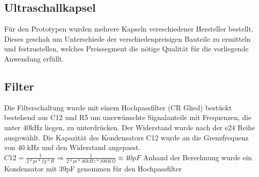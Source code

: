 \subsection{Ultraschallkapsel}%
Für den Prototypen wurden mehrere Kapseln vereschiedener Hersteller bestellt. Dieses geschah um Unterschiede der verschiedenpreisigen Bauteile zu ermitteln und festzustellen, welches Preissegment die nötige Qualität für die vorliegende Anwendung erfüllt.


\subsection{Filter}%
Die Filterschaltung wurde mit einem Hochpassfilter (CR Glied) bestückt bestehend aus C12 und R5 um unerwünschte Signalanteile mit Frequenzen, die unter 40kHz liegen, zu unterdrücken. Der Widerstand wurde nach der e24 Reihe ausgewählt.
Die Kapazität des Kondensators C12 wurde an die Grenzfrequenz von 40 kHz und den Widerstand angepasst.
\onehalfspacing \\
\(\displaystyle C12=\frac{1}{2*pi*fg*R}\Rightarrow\frac{1}{2*pi*40kHz*100 K\Omega}\approx40pF \)
\singlespacing
Anhand der Berechnung wurde ein Kondensator mit 39pF genommen für den Hochpassfilter

